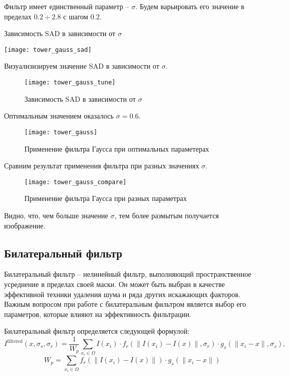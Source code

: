 Фильтр имеет единственный параметр -- $\sigma$. Будем варьировать его значение в пределах $0.2 \div 2.8$ с шагом $0.2$.

\begin{table}[H]
	\centering
	\caption{Зависимость SAD в зависимости от $\sigma$}
	\texttt{[image: tower\_gauss\_sad]}
\end{table}

Визуализизируем значение SAD в зависимости от $\sigma$.

\begin{figure}[H]
	\centering
	\texttt{[image: tower\_gauss\_tune]}
	\caption{Зависимость SAD в зависимости от $\sigma$}
\end{figure}

Оптимальным значением оказалось $\sigma = 0.6$.

\begin{figure}[H]
	\centering
	\texttt{[image: tower\_gauss]}
	\caption{Применение фильтра Гаусса при оптимальных параметерах}
\end{figure}

Сравним результат применения фильтра при разных значениях $\sigma$.

\begin{figure}[H]
	\centering
	\texttt{[image: tower\_gauss\_compare]}
	\caption{Применение фильтра Гаусса при разных параметрах}
\end{figure}

Видно, что, чем больше значение $\sigma$, тем более размытым получается изображение.

\newpage

\subsection{Билатеральный фильтр}

Билатеральный фильтр -- нелинейный фильтр, выполняющий пространственное усреднение в пределах своей маски. Он может быть выбран в качестве эффективной техники удаления шума и ряда других искажающих факторов. Важным вопросом при работе с билатеральным фильтром является выбор его параметров, которые влияют на эффективность фильтрации.

Билатеральный фильтр определяется следующей формулой:
$$
I^{\text{filtered}}(x, \sigma_s, \sigma_r)={\frac {1}{W_{p}}}\sum _{x_{i}\in \Omega }I(x_{i}) \cdot f_{r}(\|I(x_{i})-I(x)\|, \sigma_r) \cdot g_{s}(\|x_{i}-x\|, \sigma_s),
$$
$$
W_{p}=\sum _{x_{i}\in \Omega }{f_{r}(\|I(x_{i})-I(x)\|) \cdot g_{s}(\|x_{i}-x\|)}
$$

